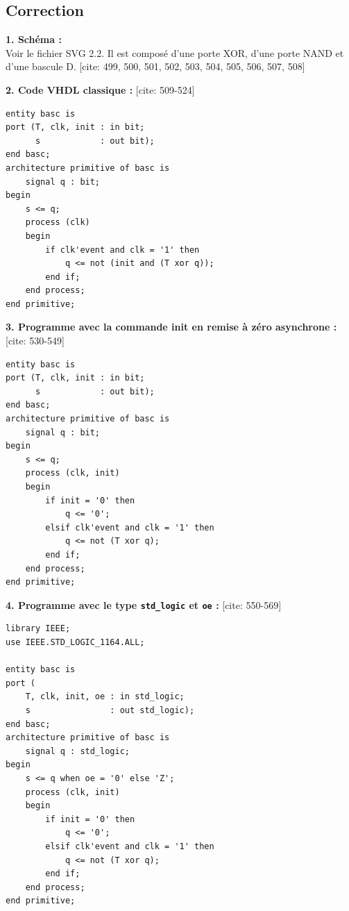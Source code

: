 \documentclass[11pt,a4paper]{article}
\begin{document}
\subsection*{Correction}

\textbf{1. Schéma :}\\
Voir le fichier SVG 2.2. Il est composé d'une porte XOR, d'une porte NAND et d'une bascule D. [cite: 499, 500, 501, 502, 503, 504, 505, 506, 507, 508]

\textbf{2. Code VHDL classique :} [cite: 509-524]
\begin{lstlisting}
entity basc is
port (T, clk, init : in bit;
      s            : out bit);
end basc;
architecture primitive of basc is
    signal q : bit;
begin
    s <= q;
    process (clk)
    begin
        if clk'event and clk = '1' then
            q <= not (init and (T xor q));
        end if;
    end process;
end primitive;
\end{lstlisting}

\textbf{3. Programme avec la commande init en remise à zéro asynchrone :} [cite: 530-549]
\begin{lstlisting}
entity basc is
port (T, clk, init : in bit;
      s            : out bit);
end basc;
architecture primitive of basc is
    signal q : bit;
begin
    s <= q;
    process (clk, init)
    begin
        if init = '0' then
            q <= '0';
        elsif clk'event and clk = '1' then
            q <= not (T xor q);
        end if;
    end process;
end primitive;
\end{lstlisting}

\textbf{4. Programme avec le type \texttt{std\_logic} et \texttt{oe} :} [cite: 550-569]
\begin{lstlisting}
library IEEE;
use IEEE.STD_LOGIC_1164.ALL;

entity basc is
port (
    T, clk, init, oe : in std_logic;
    s                : out std_logic);
end basc;
architecture primitive of basc is
    signal q : std_logic;
begin
    s <= q when oe = '0' else 'Z';
    process (clk, init)
    begin
        if init = '0' then
            q <= '0';
        elsif clk'event and clk = '1' then
            q <= not (T xor q);
        end if;
    end process;
end primitive;
\end{lstlisting}
\end{document}
